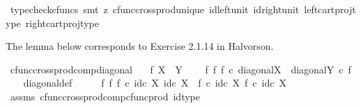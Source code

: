 \begin{isabellebody}
\isamarkupfalse%
\ {\isacharparenleft}{\kern0pt}typecheck{\isacharunderscore}{\kern0pt}cfuncs{\isacharcomma}{\kern0pt}\ smt\ {\isacharparenleft}{\kern0pt}z{}{\isacharparenright}{\kern0pt}\ cfunc{\isacharunderscore}{\kern0pt}cross{\isacharunderscore}{\kern0pt}prod{\isacharunderscore}{\kern0pt}unique\ id{\isacharunderscore}{\kern0pt}left{\isacharunderscore}{\kern0pt}unit{}\ id{\isacharunderscore}{\kern0pt}right{\isacharunderscore}{\kern0pt}unit{}\ left{\isacharunderscore}{\kern0pt}cart{\isacharunderscore}{\kern0pt}proj{\isacharunderscore}{\kern0pt}type\ right{\isacharunderscore}{\kern0pt}cart{\isacharunderscore}{\kern0pt}proj{\isacharunderscore}{\kern0pt}type{\isacharparenright}{\kern0pt}%
\endisatagproof
{\isafoldproof}%
%
\isadelimproof
%
\endisadelimproof
%
\begin{isamarkuptext}%
The lemma below corresponds to Exercise 2.1.14 in Halvorson.%
\end{isamarkuptext}\isamarkuptrue%
\isamarkupfalse%
\ cfunc{\isacharunderscore}{\kern0pt}cross{\isacharunderscore}{\kern0pt}prod{\isacharunderscore}{\kern0pt}comp{\isacharunderscore}{\kern0pt}diagonal{\isacharcolon}{\kern0pt}\isanewline
\ \ \ {\isachardoublequoteopen}f{\isacharcolon}{\kern0pt}\ X\ {\isasymrightarrow}\ Y{\isachardoublequoteclose}\ \isanewline
\ \ \ {\isachardoublequoteopen}{\isacharparenleft}{\kern0pt}f\ {\isasymtimes}\isactrlsub f\ f{\isacharparenright}{\kern0pt}\ {\isasymcirc}\isactrlsub c\ diagonal{\isacharparenleft}{\kern0pt}X{\isacharparenright}{\kern0pt}\ {\isacharequal}{\kern0pt}\ diagonal{\isacharparenleft}{\kern0pt}Y{\isacharparenright}{\kern0pt}\ {\isasymcirc}\isactrlsub c\ f{\isachardoublequoteclose}\isanewline
%
\isadelimproof
\ \ %
\endisadelimproof
%
\isatagproof
{}\isamarkupfalse%
\ diagonal{\isacharunderscore}{\kern0pt}def\isanewline
{}\isamarkupfalse%
\ {\isacharminus}{\kern0pt}\isanewline
\ \ \isamarkupfalse%
\ {\isachardoublequoteopen}{\isacharparenleft}{\kern0pt}f\ {\isasymtimes}\isactrlsub f\ f{\isacharparenright}{\kern0pt}\ {\isasymcirc}\isactrlsub c\ {\isasymlangle}id\isactrlsub c\ X{\isacharcomma}{\kern0pt}\ id\isactrlsub c\ X{\isasymrangle}\ {\isacharequal}{\kern0pt}\ {\isasymlangle}f\ {\isasymcirc}\isactrlsub c\ id\isactrlsub c\ X{\isacharcomma}{\kern0pt}\ f\ {\isasymcirc}\isactrlsub c\ id\isactrlsub c\ X{\isasymrangle}{\isachardoublequoteclose}\isanewline
\ \ \ \ \isamarkupfalse%
\ assms\ cfunc{\isacharunderscore}{\kern0pt}cross{\isacharunderscore}{\kern0pt}prod{\isacharunderscore}{\kern0pt}comp{\isacharunderscore}{\kern0pt}cfunc{\isacharunderscore}{\kern0pt}prod\ id{\isacharunderscore}{\kern0pt}type\ \isamarkupfalse%

\end{isabellebody}
